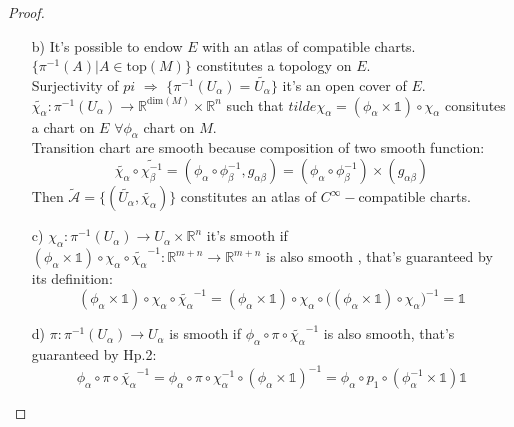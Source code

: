 \documentclass[a4paper,12pt]{scrartcl}    %
\begin{document}
\begin{proof}
\begin{itemize}
\item[b)] It's possible to endow $E$ with an atlas of compatible charts.
	\\
	$\{\pi^{-1}(A) \vert A \in \textrm{top}(M) \}$ constitutes a topology on $E$.
	\\
	Surjectivity of $pi$ $\Rightarrow$ $\{\pi^{-1}(U_\alpha) =\tilde{U_\alpha} \}$ it's an open cover of $E$.
	\\
	$\tilde{\chi_\alpha}: \pi^{-1}(U_\alpha) \rightarrow \mathbb{R}^{\textrm{dim}(M)}\times \mathbb{R}^n$ such that $tilde{\chi_\alpha} = ( \phi_\alpha \times \mathbb{1} ) \circ \chi_\alpha$ consitutes a chart on $E$ $\forall \phi_\alpha$ chart on  $M$.
	\\
	Transition chart are smooth because composition of two smooth function:
	\begin{displaymath}
	\tilde{\chi_\alpha}\circ \tilde{\chi_\beta^{-1}} = (\phi_\alpha \circ \phi_\beta^{-1}, g_{\alpha \beta} )
	=(\phi_\alpha \circ \phi_\beta^{-1}) \times ( g_{\alpha \beta} )
	\end{displaymath}
	\vspace{5mm}
	Then $\tilde{\mathcal{A}} = \{( \tilde{U_\alpha}, \tilde{\chi_\alpha} ) \}$ constitutes an atlas of $C^\infty-$compatible charts.

\item[c)] $\chi_\alpha: \pi^{-1}(U_\alpha) \rightarrow U_\alpha \times \mathbb{R}^n$ it's smooth if $(\phi_\alpha \times \mathbb{1}) \circ \chi_\alpha \circ \tilde{\chi_\alpha}^{-1}: \mathbb{R}^{m+n}\rightarrow \mathbb{R}^{m+n}$ is also smooth , that's guaranteed by its definition:
	\begin{displaymath}
	(\phi_\alpha \times \mathbb{1}) \circ \chi_\alpha \circ \tilde{\chi_\alpha}^{-1}= (\phi_\alpha \times \mathbb{1}) \circ \chi_\alpha \circ \big( (\phi_\alpha \times \mathbb{1}) \circ \chi_\alpha \big)^{-1} = \mathbb{1}
	\end{displaymath}	 
\item[d)] $\pi : \pi^{-1}(U_\alpha) \rightarrow U_\alpha $ is smooth if $\phi_\alpha \circ \pi \circ \tilde{\chi_\alpha}^{-1}$ is also smooth, that's guaranteed by Hp.2:
	\begin{displaymath}
		\phi_\alpha \circ \pi \circ \tilde{\chi_\alpha}^{-1} =
		\phi_\alpha \circ \pi \circ \chi_{\alpha}^{-1} \circ (\phi_\alpha \times \mathbb{1})^{-1} =
		\phi_\alpha \circ p_1 \circ ( \phi_\alpha^{-1} \times \mathbb{1} ) \mathbb{1}
	\end{displaymath}
\end{itemize}


\end{proof}
\end{document}
